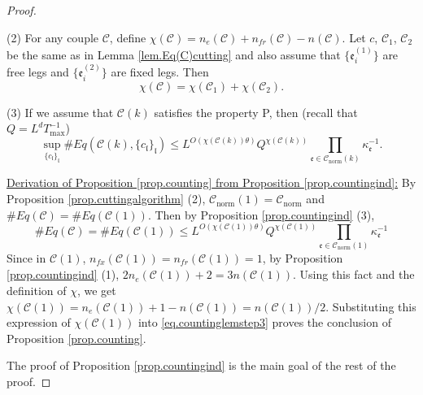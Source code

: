 \begin{proof}
\begin{prop}
(2) For any couple $\mathcal{C}$, define $\chi(\mathcal{C})=n_e(\mathcal{C})+n_{\textit{fr}}(\mathcal{C})-n(\mathcal{C})$. Let $c$, $\mathcal{C}_1$, $\mathcal{C}_2$ be the same as in Lemma \ref{lem.Eq(C)cutting} and also assume that $\{\mathfrak{e}_{i}^{(1)}\}$ are free legs and $\{\mathfrak{e}_{i}^{(2)}\}$ are fixed legs. Then 
\begin{equation}
    \chi(\mathcal{C})=\chi(\mathcal{C}_1)+\chi(\mathcal{C}_2).
\end{equation}

(3) If we assume that $\mathcal{C}(k)$ satisfies the property P, then (recall that $Q=L^{d}T^{-1}_{\text{max}}$)
\begin{equation}\label{eq.countingbd3}
\sup_{\{c_{\mathfrak{l}}\}_{\mathfrak{l}}}\#Eq(\mathcal{C}(k),\{c_{\mathfrak{l}}\}_{\mathfrak{l}})\leq L^{O\left(\chi(\mathcal{C}(k))\theta\right)} Q^{\chi(\mathcal{C}(k))}\prod_{\mathfrak{e}\in \mathcal{C}_{\text{norm}}(k)} \kappa^{-1}_{\mathfrak{e}} .
\end{equation}

\end{prop}

\underline{Derivation of Proposition \ref{prop.counting} from Proposition \ref{prop.countingind}:} 
By Proposition \ref{prop.cuttingalgorithm} (2), $\mathcal{C}_{\text{norm}}(1)=\mathcal{C}_{\text{norm}}$ and $\# Eq(\mathcal{C})=\# Eq(\mathcal{C}(1))$. Then by Proposition \ref{prop.countingind} (3), 
\begin{equation}\label{eq.countinglemstep3}
    \# Eq(\mathcal{C})=\# Eq(\mathcal{C}(1))\leq L^{O(\chi(\mathcal{C}(1))\theta)} Q^{\chi(\mathcal{C}(1))}\prod_{\mathfrak{e}\in \mathcal{C}_{\text{norm}}(1)} \kappa^{-1}_{\mathfrak{e}}
\end{equation}
Since in $\mathcal{C}(1)$, $n_{fx}(\mathcal{C}(1))=n_{\textit{fr}}(\mathcal{C}(1))=1$, by Proposition \ref{prop.countingind} (1), $2n_e(\mathcal{C}(1))+2=3n(\mathcal{C}(1))$. Using this fact and the definition of $\chi$, we get $\chi(\mathcal{C}(1))=n_e(\mathcal{C}(1))+1-n(\mathcal{C}(1))=n(\mathcal{C}(1))/2$. Substituting this expression of $\chi(\mathcal{C}(1))$ into \eqref{eq.countinglemstep3} proves the conclusion of Proposition \ref{prop.counting}. 

The proof of Proposition \ref{prop.countingind} is the main goal of the rest of the proof.



\end{proof}

